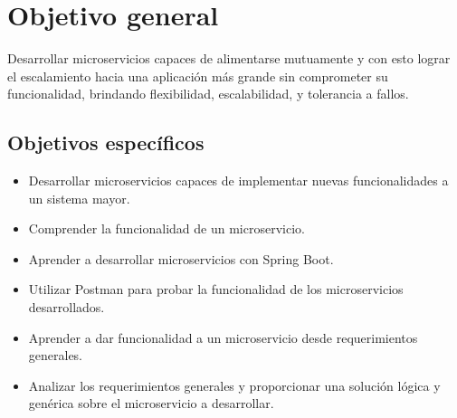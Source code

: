\section{Objetivo general}
Desarrollar microservicios capaces de alimentarse mutuamente y con esto lograr el escalamiento hacia una aplicación más grande sin comprometer su funcionalidad, brindando flexibilidad, escalabilidad, y tolerancia a fallos.\\
\subsection{Objetivos específicos}
\begin{itemize}
	\item Desarrollar microservicios capaces de implementar nuevas funcionalidades a un sistema mayor.
	\item Comprender la funcionalidad de un microservicio.
	\item Aprender a desarrollar microservicios con Spring Boot.
	\item Utilizar Postman para probar la funcionalidad de los microservicios desarrollados.
	\item Aprender a dar funcionalidad a un microservicio desde requerimientos generales.
	\item Analizar los requerimientos generales y proporcionar una solución lógica y genérica sobre el microservicio a desarrollar.
\end{itemize}
